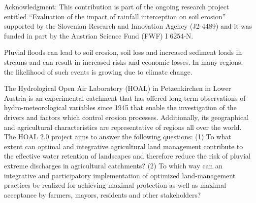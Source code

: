 Acknowledgment: This contribution is part of the ongoing research project entitled “Evaluation of the impact of rainfall interception on soil erosion” supported by the Slovenian Research and Innovation Agency (J2-4489) and it was funded in part by the Austrian Science Fund (FWF) I 6254-N.



\newpage{}
{}
\begin{flushleft}






\end{flushleft}

\noindent

Pluvial floods can lead to soil erosion, soil loss and increased sediment loads in streams and can result in increased risks and economic losses. In many regions, the likelihood of such events is growing due to climate change.

The Hydrological Open Air Laboratory (HOAL) in Petzenkirchen in Lower Austria is an experimental catchment that has offered long-term observations of hydro-meteorological variables since 1945 that enable the investigation of the drivers and factors which control erosion processes. Additionally, its geographical and agricultural characteristics are representative of regions all over the world. The HOAL 2.0 project aims to answer the following questions: (1) To what extent can optimal and integrative agricultural land management contribute to the effective water retention of landscapes and therefore reduce the risk of pluvial extreme discharges in agricultural catchments? (2) To which way can an integrative and participatory implementation of optimized land-management practices be realized for achieving maximal protection as well as maximal acceptance by farmers, mayors, residents and other stakeholders?

